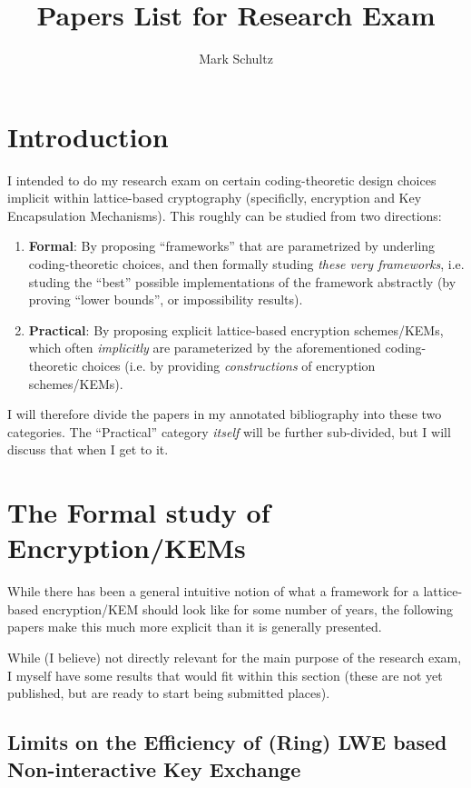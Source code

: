 \documentclass{article}
\begin{document}
	\title{Papers List for Research Exam}
	\author{Mark Schultz}
	\maketitle
	\section{Introduction}
	I intended to do my research exam on certain coding-theoretic design choices implicit within lattice-based cryptography (specificlly, encryption and Key Encapsulation Mechanisms).
	This roughly can be studied from two directions:
	\begin{enumerate}
		\item \textbf{Formal}: By proposing ``frameworks'' that are parametrized by underling coding-theoretic choices, and then formally studing \emph{these very frameworks}, i.e. studing the ``best'' possible implementations of the framework abstractly (by proving ``lower bounds'', or impossibility results).
		\item \textbf{Practical}: By proposing explicit lattice-based encryption schemes/KEMs, which often \emph{implicitly} are parameterized by the aforementioned coding-theoretic choices (i.e. by providing \emph{constructions} of encryption schemes/KEMs).
	\end{enumerate}
	I will therefore divide the papers in my annotated bibliography into these two categories.
	The ``Practical'' category \emph{itself} will be further sub-divided, but I will discuss that when I get to it.
	\section{The Formal study of Encryption/KEMs}
	While there has been a general intuitive notion of what a framework for a lattice-based encryption/KEM should look like for some number of years, the following papers make this much more explicit than it is generally presented.
	
	While (I believe) not directly relevant for the main purpose of the research exam, I myself have some results that would fit within this section (these are not yet published, but are ready to start being submitted places).
	
	\subsection{Limits on the Efficiency of (Ring) LWE based Non-interactive Key Exchange}
	
\end{document}

